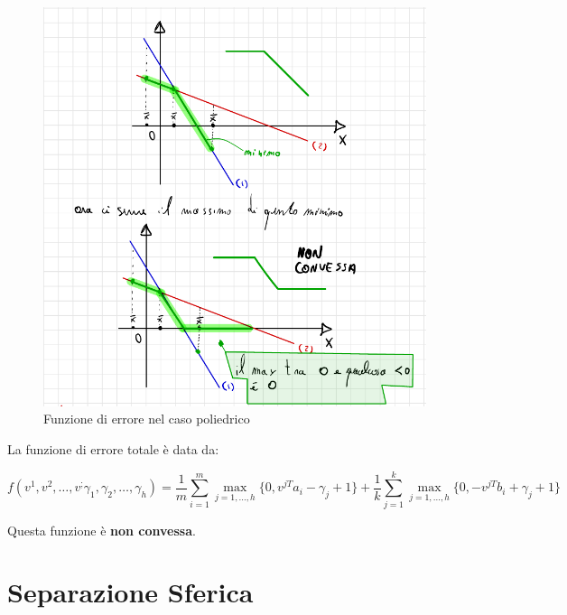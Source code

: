 \begin{definition}
    \begin{figure}[H]
        \centering
        \includegraphics[width=0.8\linewidth]{images/tosta.png}
        \caption{Funzione di errore nel caso poliedrico}
        \label{fig:3-1}
    \end{figure}
    
    La funzione di errore 
    totale è data da:

    $$
        f ( v^1, v^2, \dots, v^; \gamma_1, \gamma_2, \dots, \gamma_h ) = \frac{1}{m} \sum_{i=1}^{m} \max_{j=1, \dots, h} \{0, v^{jT} a_i - \gamma_j + 1\} + \frac{1}{k} \sum_{j=1}^{k} \max_{j=1, \dots, h} \{0, -v^{jT} b_i + \gamma_j + 1\}
    $$

    Questa funzione è \textbf{non convessa}.
\end{definition}


\section{Separazione Sferica}


